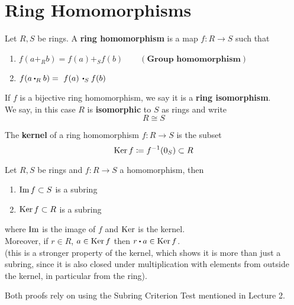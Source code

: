 \documentclass[../Main.tex]{subfiles}
\begin{document}
\section*{Ring Homomorphisms}
\begin{dfn}[title = Ring Homomorphism and Isomorphism]
	Let $R,S$ be rings. A \textbf{ring homomorphism} is a map $f: R \to S$ such that
	\begin{enumerate}
		\item $f(a+_R b) = f(a) +_S f(b) \qquad (\textbf{Group homomorphism})$
		\item $f(a\rdot_R b) = \,\,f(a)\,\rdot_S f(b)$
	\end{enumerate}
	If $f$ is a bijective ring homomorphism, we say it is a \textbf{ring isomorphism}.\\
	We say, in this case $R$ is \textbf{isomorphic} to $S$ as rings and write
	\[R \cong S\]
\end{dfn}
\begin{dfn}[title = Kernel]
	The \textbf{kernel} of a ring homomorphism $f: R\to S$ is the subset
	\[\operatorname{Ker} f \coloneqq f^{-1}(0_S)\subset R\]
\end{dfn}
\begin{prop}[title = \texorpdfstring{$\Ker f$}{Ker f} is an ideal]
	Let $R,S$ be rings and $f: R \to S$ a homomorphism, then
	\begin{enumerate}
		\item $\operatorname{Im} f \subset S$ is a subring
		\item $\operatorname{Ker} f \subset R$ is a subring
	\end{enumerate}
	where $\operatorname{Im}$ is the image of $f$ and $\operatorname{Ker}$ is the kernel.\\
	Moreover, if $r\in R$, $a\in \operatorname{Ker} f$ then $r\rdot a \in \Ker f$.\\
	 (this is a stronger property of the kernel, which shows it is more than just a subring, since it is also closed under multiplication with elements from outside the kernel, in particular from the ring).
\end{prop}
Both proofs rely on using the Subring Criterion Test mentioned in Lecture 2.
\end{document}
